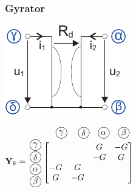 \documentclass[a4paper,twocolumn,10pt]{article}
\newcommand*\kreis[1]{\unitlength1ex\begin{picture}(2.5,2.5)%
\put(0.75,0.75){\circle{3}}\put(0.7,0.7){\makebox(0,0){#1}}\end{picture}}
\begin{document}
\subsubsection*{Gyrator}
\begin{minipage}[b]{0.18\textwidth}
\includegraphics[width=\textwidth]{Grafiken/KSA_Gyrator}
\end{minipage}
\hfill
\begin{minipage}[b]{0.30\textwidth}
$\textbf{Y}_k=\;\;\begin{matrix}\begin{matrix} \;\;\; & \;\;\;\kreis{$\gamma$} & \;\;\kreis{$\delta$} & \;\kreis{$\alpha$} & \;\kreis{$\beta$} \end{matrix}\\\begin{matrix} \kreis{$\gamma$} \\ \kreis{$\delta$} \\ \kreis{$\alpha$} \\ \kreis{$\beta$} \end{matrix} \left[\begin{matrix}  &  & G & -G \\  &  & -G & G \\ -G & G & & \\ G & -G & & \end{matrix}\right]\\ \; \end{matrix}$\\
\end{minipage}
\end{document}
